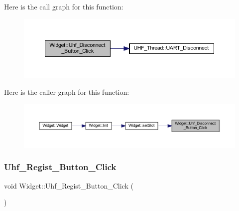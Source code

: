 Here is the call graph for this function\+:
\nopagebreak
\begin{figure}[H]
\begin{center}
\leavevmode
\includegraphics[width=350pt]{class_widget_a0186f9125495a90a0166280d932ae831_cgraph}
\end{center}
\end{figure}
Here is the caller graph for this function\+:
\nopagebreak
\begin{figure}[H]
\begin{center}
\leavevmode
\includegraphics[width=350pt]{class_widget_a0186f9125495a90a0166280d932ae831_icgraph}
\end{center}
\end{figure}
\mbox{\label{class_widget_aaa7751b71135c9c841b9036d25570134}} 
\subsubsection{\texorpdfstring{Uhf\_Regist\_Button\_Click}{Uhf\_Regist\_Button\_Click}}
{\footnotesize\ttfamily void Widget\+::\+Uhf\+\_\+\+Regist\+\_\+\+Button\+\_\+\+Click (\begin{DoxyParamCaption}{ }\end{DoxyParamCaption})\hspace{0.3cm}{\ttfamily [slot]}}

